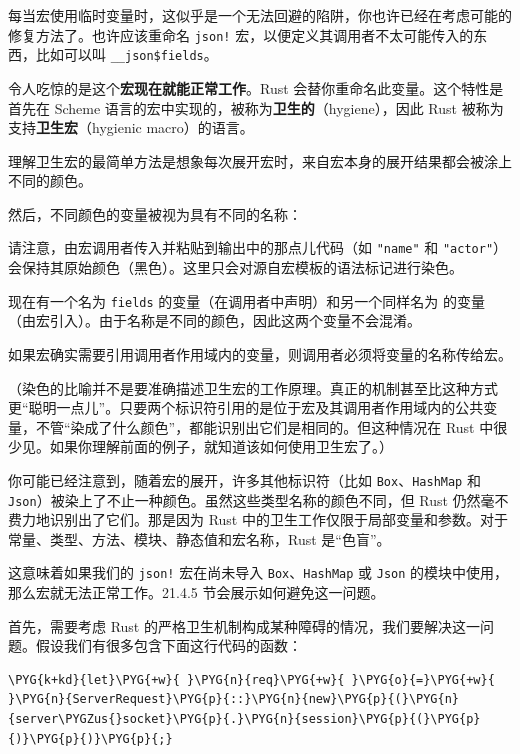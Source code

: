 每当宏使用临时变量时，这似乎是一个无法回避的陷阱，你也许已经在考虑可能的修复方法了。也许应该重命名 \texttt{json!} 宏，以便定义其调用者不太可能传入的东西，比如可以叫 \texttt{\_\_json\$fields}。

令人吃惊的是这个\textbf{宏现在就能正常工作}。Rust 会替你重命名此变量。这个特性是首先在 Scheme 语言的宏中实现的，被称为\textbf{卫生的}（hygiene），因此 Rust 被称为支持\textbf{卫生宏}（hygienic macro）的语言。

理解卫生宏的最简单方法是想象每次展开宏时，来自宏本身的展开结果都会被涂上不同的颜色。

然后，不同颜色的变量被视为具有不同的名称：


请注意，由宏调用者传入并粘贴到输出中的那点儿代码（如 \texttt{"name"} 和 \texttt{"actor"}）会保持其原始颜色（黑色）。这里只会对源自宏模板的语法标记进行染色。

现在有一个名为 \texttt{fields} 的变量（在调用者中声明）和另一个同样名为  的变量（由宏引入）。由于名称是不同的颜色，因此这两个变量不会混淆。

如果宏确实需要引用调用者作用域内的变量，则调用者必须将变量的名称传给宏。

（染色的比喻并不是要准确描述卫生宏的工作原理。真正的机制甚至比这种方式更“聪明一点儿”。只要两个标识符引用的是位于宏及其调用者作用域内的公共变量，不管“染成了什么颜色”，都能识别出它们是相同的。但这种情况在 Rust 中很少见。如果你理解前面的例子，就知道该如何使用卫生宏了。）

你可能已经注意到，随着宏的展开，许多其他标识符（比如 \texttt{Box}、\texttt{HashMap} 和 \texttt{Json}）被染上了不止一种颜色。虽然这些类型名称的颜色不同，但 Rust 仍然毫不费力地识别出了它们。那是因为 Rust 中的卫生工作仅限于局部变量和参数。对于常量、类型、方法、模块、静态值和宏名称，Rust 是“色盲”。

这意味着如果我们的 \texttt{json!} 宏在尚未导入 \texttt{Box}、\texttt{HashMap} 或 \texttt{Json} 的模块中使用，那么宏就无法正常工作。21.4.5 节会展示如何避免这一问题。

首先，需要考虑 Rust 的严格卫生机制构成某种障碍的情况，我们要解决这一问题。假设我们有很多包含下面这行代码的函数：

\begin{Verbatim}[commandchars=\\\{\},breaklines=true,breakanywhere=true,fontsize=\codefont,xleftmargin=17bp]
\PYG{k+kd}{let}\PYG{+w}{ }\PYG{n}{req}\PYG{+w}{ }\PYG{o}{=}\PYG{+w}{ }\PYG{n}{ServerRequest}\PYG{p}{::}\PYG{n}{new}\PYG{p}{(}\PYG{n}{server\PYGZus{}socket}\PYG{p}{.}\PYG{n}{session}\PYG{p}{(}\PYG{p}{)}\PYG{p}{)}\PYG{p}{;}
\end{Verbatim}

